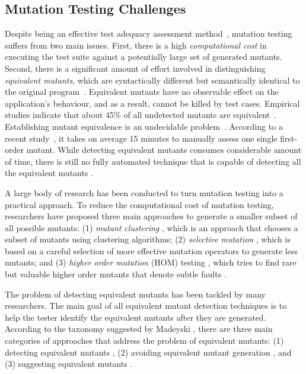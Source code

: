 \subsection{Mutation Testing Challenges}
Despite being an effective test adequacy assessment method~\cite{andrews:icse05,jia:tse10}, mutation testing suffers from two main issues.  First, there is a high \emph{computational cost} in executing the test suite against a potentially large set of generated mutants. Second, there is a significant amount of effort  involved in distinguishing \emph{equivalent mutants}, which are syntactically different but semantically identical to the original program~\cite{budd:acta82}.  Equivalent mutants have no observable effect on the application's behaviour, and as a result, cannot be killed by test cases. Empirical studies indicate that about 45\% of all undetected mutants are equivalent~\cite{schuler:tvr12, madeyski:tse13}.   
Establishing mutant equivalence is an undecidable problem~\cite{budd:acta82}. 
According to a recent study~\cite{madeyski:tse13}, it takes on average 15 minutes to manually assess one single first-order mutant. While detecting equivalent mutants consumes considerable amount of time, there is still no fully automated technique that is capable of detecting all the equivalent mutants \cite{madeyski:tse13}.

A large body of research has been conducted to turn mutation testing into a practical approach.
To reduce the computational cost of  mutation testing, researchers have
proposed three main approaches to generate a smaller subset of all possible mutants: 
(1) \emph{mutant clustering} \cite{ji:seke09}, which is an approach that chooses a subset of
mutants using clustering algorithms; (2)  \emph{selective mutation} \cite{barbosa:stvr01, siami:icse08, zhang:icse10}, which is based on a  
careful selection of more effective mutation operators to generate less mutants; and 
 (3) \emph{higher order mutation} (HOM) testing \cite{jia:scam08}, which tries to find 
rare but valuable higher order mutants that denote subtle faults \cite{jia:tse10}.   

The problem of detecting equivalent mutants has been tackled by many researchers. The main goal of all equivalent mutant detection techniques is to help the tester identify the equivalent mutants after they are generated.
According to the taxonomy suggested by Madeyski \etal \cite{madeyski:tse13}, there are three main categories of approaches that address the problem of equivalent mutants: (1) detecting equivalent mutants \cite{offutt:tvr97}, (2) avoiding equivalent mutant generation \cite{gligoric:issta13}, and (3) suggesting equivalent mutants \cite{schuler:tvr12}. 

